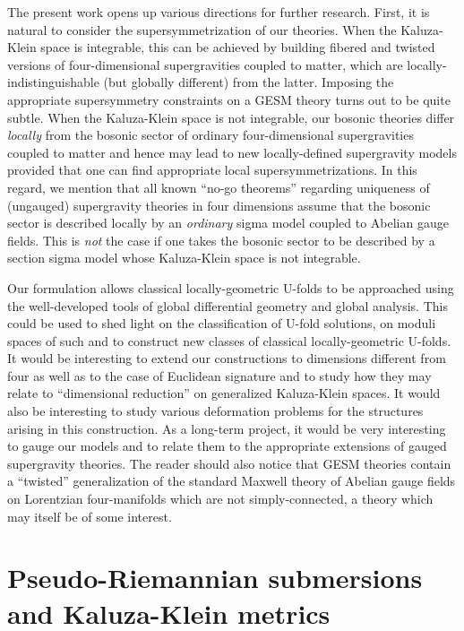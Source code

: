 \documentclass[10pt, cmp, numbook, final, a4paper]{svjour}
\begin{document}
The present work opens up various directions for further
research. First, it is natural to consider the supersymmetrization of
our theories. When the Kaluza-Klein space is integrable, this can be
achieved by building fibered and twisted versions of four-dimensional
supergravities coupled to matter, which are locally-indistinguishable
(but globally different) from the latter. Imposing the appropriate
supersymmetry constraints on a GESM theory turns out to be quite subtle. 
When the Kaluza-Klein space is not integrable, our bosonic
theories differ {\em locally} from the bosonic sector of ordinary
four-dimensional supergravities coupled to matter and hence may lead
to new locally-defined supergravity models provided that one can find
appropriate local supersymmetrizations. In this regard, we mention
that all known ``no-go theorems'' regarding uniqueness of (ungauged)
supergravity theories in four dimensions assume that the bosonic
sector is described locally by an {\em ordinary} sigma model coupled to
Abelian gauge fields. This is {\em not} the case if one takes the
bosonic sector to be described by a section sigma model whose
Kaluza-Klein space is not integrable.
		
Our formulation allows classical locally-geometric U-folds to be
approached using the well-developed tools of global differential
geometry and global analysis. This could be used to shed light on the
classification of U-fold solutions, on moduli spaces of such and to
construct new classes of classical locally-geometric U-folds. It would
be interesting to extend our constructions to dimensions different
from four as well as to the case of Euclidean signature and to study
how they may relate to ``dimensional reduction'' on generalized
Kaluza-Klein spaces. It would also be interesting to study various
deformation problems for the structures arising in this construction. As a long-term
project, it would be very interesting to gauge our models and to
relate them to the appropriate extensions of gauged supergravity
theories. The reader should also notice that GESM theories contain a
``twisted'' generalization of the standard Maxwell theory of Abelian
gauge fields on Lorentzian four-manifolds which are not
simply-connected, a theory which may itself be of some interest.

\appendix

\section{Pseudo-Riemannian submersions and Kaluza-Klein metrics}
\label{app:submersions}
\end{document}
